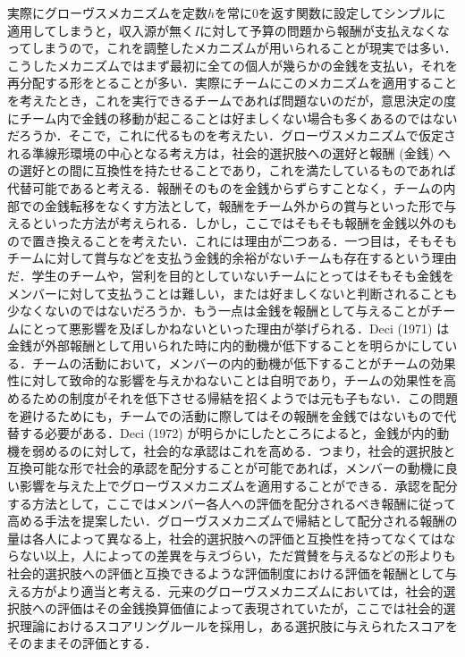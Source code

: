 \documentclass[a4paper, 11pt]{jsarticle}
\begin{document}
実際にグローヴスメカニズムを定数\(h\)を常に\(0\)を返す関数に設定してシンプルに適用してしまうと，収入源が無く\(I\)に対して予算の問題から報酬が支払えなくなってしまうので，これを調整したメカニズムが用いられることが現実では多い．こうしたメカニズムではまず最初に全ての個人が幾らかの金銭を支払い，それを再分配する形をとることが多い．実際にチームにこのメカニズムを適用することを考えたとき，これを実行できるチームであれば問題ないのだが，意思決定の度にチーム内で金銭の移動が起こることは好ましくない場合も多くあるのではないだろうか．そこで，これに代るものを考えたい．グローヴスメカニズムで仮定される準線形環境の中心となる考え方は，社会的選択肢への選好と報酬 (金銭) への選好との間に互換性を持たせることであり，これを満たしているものであれば代替可能であると考える．報酬そのものを金銭からずらすことなく，チームの内部での金銭転移をなくす方法として，報酬をチーム外からの賞与といった形で与えるといった方法が考えられる．しかし，ここではそもそも報酬を金銭以外のもので置き換えることを考えたい．これには理由が二つある．一つ目は，そもそもチームに対して賞与などを支払う金銭的余裕がないチームも存在するという理由だ．学生のチームや，営利を目的としていないチームにとってはそもそも金銭をメンバーに対して支払うことは難しい，または好ましくないと判断されることも少なくないのではないだろうか．もう一点は金銭を報酬として与えることがチームにとって悪影響を及ぼしかねないといった理由が挙げられる．Deci (1971) \cite{Deci}は金銭が外部報酬として用いられた時に内的動機が低下することを明らかにしている．チームの活動において，メンバーの内的動機が低下することがチームの効果性に対して致命的な影響を与えかねないことは自明であり，チームの効果性を高めるための制度がそれを低下させる帰結を招くようでは元も子もない．この問題を避けるためにも，チームでの活動に際してはその報酬を金銭ではないもので代替する必要がある．Deci (1972) \cite{Deci2}が明らかにしたところによると，金銭が内的動機を弱めるのに対して，社会的な承認はこれを高める．つまり，社会的選択肢と互換可能な形で社会的承認を配分することが可能であれば，メンバーの動機に良い影響を与えた上でグローヴスメカニズムを適用することができる．承認を配分する方法として，ここではメンバー各人への評価を配分されるべき報酬に従って高める手法を提案したい．グローヴスメカニズムで帰結として配分される報酬の量は各人によって異なる上，社会的選択肢への評価と互換性を持ってなくてはならない以上，人によっての差異を与えづらい，ただ賞賛を与えるなどの形よりも社会的選択肢への評価と互換できるような評価制度における評価を報酬として与える方がより適当と考える．元来のグローヴスメカニズムにおいては，社会的選択肢への評価はその金銭換算価値によって表現されていたが，ここでは社会的選択理論におけるスコアリングルールを採用し，ある選択肢に与えられたスコアをそのままその評価とする．
\end{document}

